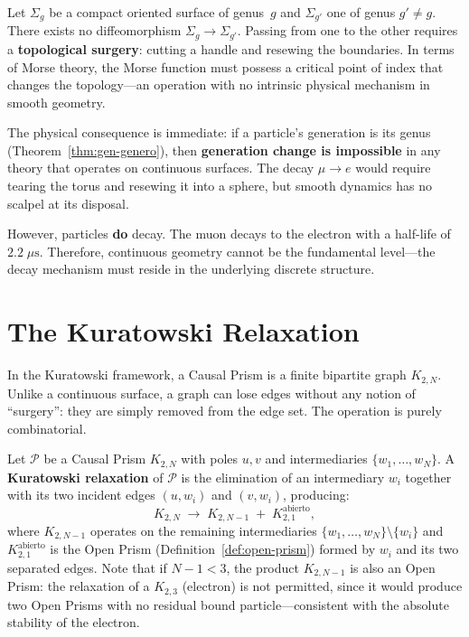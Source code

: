 \begin{theorem}
\label{thm:barrera-cobordismo}
Let $\Sigma_g$ be a compact oriented surface of genus~$g$ and
$\Sigma_{g'}$ one of genus $g' \neq g$. There exists no
diffeomorphism $\Sigma_g \to \Sigma_{g'}$. Passing from one to the other
requires a \textbf{topological surgery}: cutting a handle and resewing the
boundaries. In terms of Morse theory, the Morse function must
possess a critical point of index that changes the topology---an
operation with no intrinsic physical mechanism in smooth geometry.
\end{theorem}

The physical consequence is immediate: if a particle's generation
is its genus (Theorem~\ref{thm:gen-genero}), then \textbf{generation
change is impossible} in any theory that operates on
continuous surfaces. The decay $\mu \to e$ would require tearing the
torus and resewing it into a sphere, but smooth dynamics has no
scalpel at its disposal.

However, particles \textbf{do} decay. The muon decays
to the electron with a half-life of $2.2\;\mu\text{s}$. Therefore,
continuous geometry cannot be the fundamental level---the decay
mechanism must reside in the underlying discrete structure.

\section{The Kuratowski Relaxation}
\label{sec:relajacion}

In the Kuratowski framework, a Causal Prism is a finite bipartite graph
$K_{2,N}$. Unlike a continuous surface, a graph can
lose edges without any notion of ``surgery'': they are simply
removed from the edge set. The operation is purely
combinatorial.

\begin{definition}
\label{def:relajacion}
Let $\mathcal{P}$ be a Causal Prism $K_{2,N}$ with poles $u, v$ and
intermediaries $\{w_1, \ldots, w_N\}$. A \textbf{Kuratowski
relaxation} of $\mathcal{P}$ is the elimination of an intermediary $w_i$
together with its two incident edges $(u, w_i)$ and $(v, w_i)$,
producing:
\[
  K_{2,N} \;\longrightarrow\; K_{2,N-1} \;+\; K_{2,1}^{\mathrm{abierto}},
\]
where $K_{2,N-1}$ operates on the remaining intermediaries
$\{w_1, \ldots, w_N\} \setminus \{w_i\}$ and
$K_{2,1}^{\mathrm{abierto}}$ is the Open Prism
(Definition~\ref{def:open-prism}) formed by $w_i$ and its two separated
edges. Note that if $N - 1 < 3$, the product $K_{2,N-1}$
is also an Open Prism: the relaxation of a $K_{2,3}$
(electron) is not permitted, since it would produce two Open
Prisms with no residual bound particle---consistent with the
absolute stability of the electron.
\end{definition}

